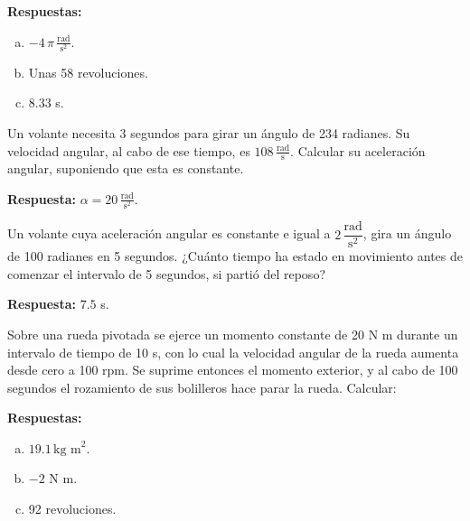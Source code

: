 \documentclass[addpoints]{exam}
\newcommand{\rta}{\textbf{Respuesta: }}
\newcommand{\rtas}{\textbf{Respuestas: }}
\begin{document}
\begin{questions}
    \rtas
    \begin{enumerate}[(a)]
        \item $-4 \, \pi \, \frac{\text{rad}}{\text{s}^2}$.
        \item Unas 58 revoluciones.
        \item 8.33 s.
    \end{enumerate}

    \question Un volante necesita 3 segundos para girar un ángulo de 234 radianes. Su velocidad angular, al cabo de ese tiempo, es $108 \, \frac{\text{rad}}{\text{s}}$. Calcular su aceleración angular, suponiendo que esta es constante.

    \rta $\alpha = 20 \, \frac{\text{rad}}{\text{s}^2}$.

    \question Un volante cuya aceleración angular es constante e igual a $2 \, \dfrac{\text{rad}}{\text{s}^2}$, gira un ángulo de 100 radianes en 5 segundos. ¿Cuánto tiempo ha estado en movimiento antes de comenzar el intervalo de 5 segundos, si partió del reposo?

    \rta $7.5$ s.

    \question Sobre una rueda pivotada se ejerce un momento constante de 20 N m durante un intervalo de tiempo de 10 s, con lo cual la velocidad angular de la rueda aumenta desde cero a 100 rpm. Se suprime entonces el momento exterior, y al cabo de 100 segundos el rozamiento de sus bolilleros hace parar la rueda. Calcular:

    \rtas
    \begin{enumerate}[(a)]
        \item $19.1 \, \text{kg m}^2$.
        \item $- 2$ N m.
        \item 92 revoluciones.
    \end{enumerate}


\end{questions}
\end{document}
